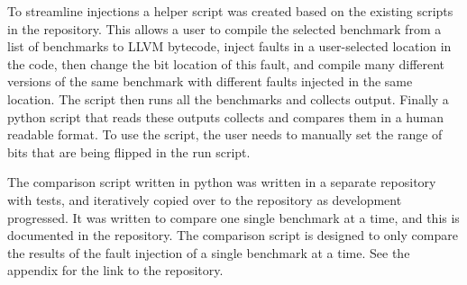 
To streamline injections a helper script was created based on the existing scripts in the \taffo{} repository. This allows a user to compile the selected benchmark from a list of benchmarks to LLVM bytecode, inject faults in a user-selected location in the code, then change the bit location of this fault, and compile many different versions of the same benchmark with different faults injected in the same location. The script then runs all the benchmarks and collects output. Finally a python script that reads these outputs collects and compares them in a human readable format. To use the script, the user needs to manually set the range of bits that are being flipped in the run script. 

The comparison script written in python was written in a separate repository with tests, and iteratively copied over to the \taffo{} repository as development progressed. It was written to compare one single benchmark at a time, and this is documented in the repository. The comparison script is designed to only compare the results of the fault injection of a single benchmark at a time. See the appendix for the link to the repository.




